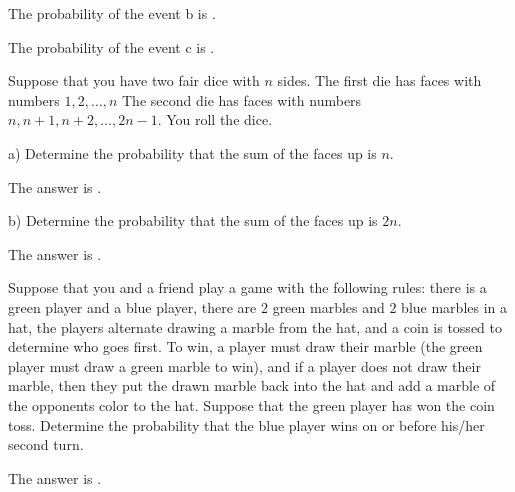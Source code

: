 \documentclass{ximera}
\begin{document}
\begin{question}     
      \begin{solution}
           The probability of the event b is .
     \end{solution}
\end{question}

\begin{question}
      \begin{solution}
           The probability of the event c is .
     \end{solution}
\end{question}

Suppose that you have two fair dice with $n$ sides.  The first die has faces with numbers $1, 2, ..., n$  The second die has faces with numbers $n, n+1, n+2, ..., 2n-1$.  You roll the dice.

\begin{question}
a)  Determine the probability that the sum of the faces up is $n$.
     \begin{solution}
           The answer is .
     \end{solution}
\end{question}

\begin{question}
b)  Determine the probability that the sum of the faces up is $2n$.
     \begin{solution}
           The answer is .
     \end{solution}
\end{question}

\begin{question}
Suppose that you and a friend play a game with the following rules:  there is a green player and a blue player,  there are $2$ green marbles and $2$ blue marbles in a hat, the players alternate drawing a marble from the hat, and a coin is tossed to determine who goes first.  To win, a player must draw their marble (the green player must draw a green marble to win), and if a player does not draw their marble, then they put the drawn marble back into the hat and add a marble of the opponents color to the hat.  Suppose that the green player has won the coin toss.  Determine the probability that the blue player wins on or before his/her second turn.
     \begin{solution}
           The answer is .
     \end{solution}
\end{question}
\end{document}
